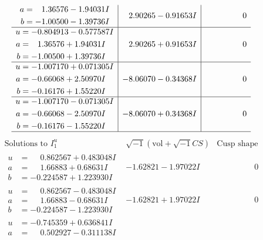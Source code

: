 \documentclass[1p]{elsarticle_modified}
\theoremstyle{definition}
\newcommand{\I}{\sqrt{-1}}
\begin{document}
$$\begin{array}{c|c|c}
\begin{aligned}
a &= \phantom{-}1.36576 - 1.94031 I \\
b &= -1.00500 - 1.39736 I\end{aligned}
 & \phantom{-}2.90265 - 0.91653 I & \phantom{-0.000000 } 0 \\ \hline\begin{aligned}
u &= -0.804913 - 0.577587 I \\
a &= \phantom{-}1.36576 + 1.94031 I \\
b &= -1.00500 + 1.39736 I\end{aligned}
 & \phantom{-}2.90265 + 0.91653 I & \phantom{-0.000000 } 0 \\ \hline\begin{aligned}
u &= -1.007170 + 0.071305 I \\
a &= -0.66068 + 2.50970 I \\
b &= -0.16176 + 1.55220 I\end{aligned}
 & -8.06070 - 0.34368 I & \phantom{-0.000000 } 0 \\ \hline\begin{aligned}
u &= -1.007170 - 0.071305 I \\
a &= -0.66068 - 2.50970 I \\
b &= -0.16176 - 1.55220 I\end{aligned}
 & -8.06070 + 0.34368 I & \phantom{-0.000000 } 0\\
 \hline 
 \end{array}$$\newpage$$\begin{array}{c|c|c}  
\text{Solutions to }I^u_{1}& \I (\text{vol} + \sqrt{-1}CS) & \text{Cusp shape}\\
 \hline 
\begin{aligned}
u &= \phantom{-}0.862567 + 0.483048 I \\
a &= \phantom{-}1.66883 + 0.68631 I \\
b &= -0.224587 + 1.223930 I\end{aligned}
 & -1.62821 - 1.97022 I & \phantom{-0.000000 } 0 \\ \hline\begin{aligned}
u &= \phantom{-}0.862567 - 0.483048 I \\
a &= \phantom{-}1.66883 - 0.68631 I \\
b &= -0.224587 - 1.223930 I\end{aligned}
 & -1.62821 + 1.97022 I & \phantom{-0.000000 } 0 \\ \hline\begin{aligned}
u &= -0.745359 + 0.636841 I \\
a &= \phantom{-}0.502927 - 0.311138 I \\

\end{aligned}
\end{array}$$
\end{document}

